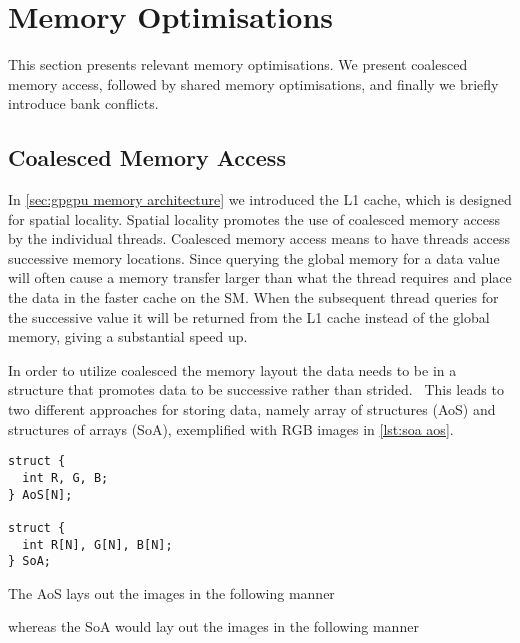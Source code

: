 \section{Memory Optimisations}
\label{sec:memory optimisations}

This section presents relevant memory optimisations.
We present coalesced memory access, followed by shared memory optimisations, and finally we briefly introduce bank conflicts.

\subsection{Coalesced Memory Access}
\label{sec:coalesced}

In \cref{sec:gpgpu memory architecture} we introduced the L1 cache, which is designed for spatial locality.
Spatial locality promotes the use of coalesced memory access by the individual threads.
Coalesced memory access means to have threads access successive memory locations.
Since querying the global memory for a data value will often cause a memory transfer larger than what the thread requires and place the data in the faster cache on the SM.
When the subsequent thread queries for the successive value it will be returned from the L1 cache instead of the global memory, giving a substantial speed up.

In order to utilize coalesced the memory layout the data needs to be in a structure that promotes data to be successive rather than strided.~\cite{udacity}
This leads to two different approaches for storing data, namely array of structures (AoS) and structures of arrays (SoA), exemplified with RGB images in \cref{lst:soa aos}.

\begin{lstlisting}[caption={Example of SoA and AoS with RGB images}, label={lst:soa aos}]
struct {
  int R, G, B;
} AoS[N];

struct {
  int R[N], G[N], B[N];
} SoA;
\end{lstlisting}

The AoS lays out the images in the following manner

\begin{quote} 
\end{quote}

whereas the SoA would lay out the images in the following manner

\begin{quote}
\end{quote}

